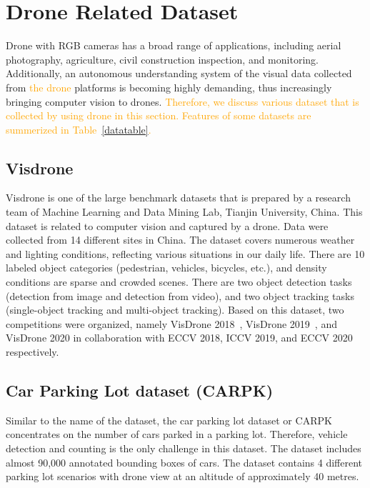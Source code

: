 \section{Drone Related Dataset}
\label{datasetsection}
Drone with RGB cameras has a broad range of applications, including aerial photography, agriculture, civil construction inspection, and monitoring. Additionally, an autonomous understanding system of the visual data collected from \textcolor{orange}{the drone} platforms is becoming highly demanding, thus increasingly bringing computer vision to drones. \textcolor{orange}{Therefore, we discuss various dataset that is collected by using drone in this section. Features of some datasets are summerized in Table~\ref{datatable}.}



\subsection{Visdrone}
Visdrone is one of the large benchmark datasets that is prepared by a research team of Machine Learning and Data Mining Lab, Tianjin University, China. This dataset is related to computer vision and captured by a drone. Data were collected from 14 different sites in China. The dataset covers numerous weather and lighting conditions, reflecting various situations in our daily life. There are 10 labeled object categories (pedestrian, vehicles, bicycles, etc.), and density conditions are sparse and crowded scenes. There are two object detection tasks (detection from image and detection from video), and two object tracking tasks (single-object tracking and multi-object tracking). Based on this dataset, two competitions were organized, namely VisDrone 2018~\textcolor{orange}{\cite{zhu2018visdrone}}, VisDrone 2019~\textcolor{orange}{\cite{pailla2019visdrone}}, and VisDrone 2020 in collaboration with ECCV 2018, ICCV 2019, and ECCV 2020 respectively.


\subsection{Car Parking Lot dataset (CARPK)}
Similar to the name of the dataset, the car parking lot dataset or CARPK concentrates on the number of cars parked in a parking lot. Therefore, vehicle detection and counting is the only challenge in this dataset. The dataset includes almost 90,000 annotated bounding boxes of cars. The dataset contains 4 different parking lot scenarios with drone view at an altitude of approximately 40 metres.

